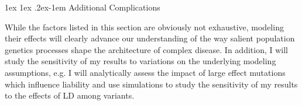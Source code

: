 \documentclass[11pt]{article}
\makeatletter
\newcommand{\jb}[1]{{\color{blue} (#1)} }
\renewcommand{\paragraph}{%
  \@startsection{paragraph}{4}%
  {\z@}{1ex \@plus 1ex \@minus .2ex}{-1em}%
  {\normalfont\normalsize\bfseries}%
}
\makeatother
\begin{document}

\paragraph{Additional Complications}

While the factors listed in this section are obviously not exhaustive, modeling their effects will clearly advance our understanding of the way salient population genetics processes shape the architecture of complex disease. In addition, I will study the sensitivity of my results to variations on the underlying modeling assumptions, e.g. I will analytically assess the impact of large effect mutations which influence liability and use simulations to study the sensitivity of my results to the effects of LD among variants.


\end{document}
